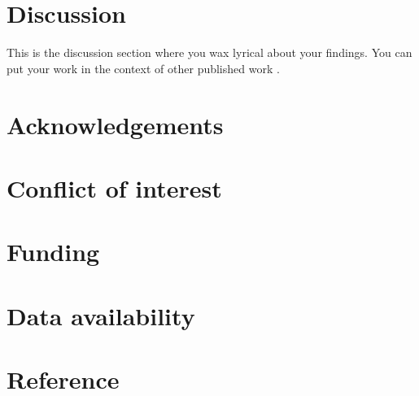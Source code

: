 \section*{Discussion}\label{sec:discussion}

This is the discussion section where you wax lyrical about your findings.
You can put your work in the context of other published work \citep{brenner_uga:_1967}.

%


\section*{Acknowledgements}\label{sec:acknowledgements}


\section*{Conflict of interest}\label{sec:conflict-of-interest}

\section*{Funding}\label{sec:funding}

\section*{Data availability}\label{sec:data-availability}


\section*{Reference}\label{sec:reference}

































